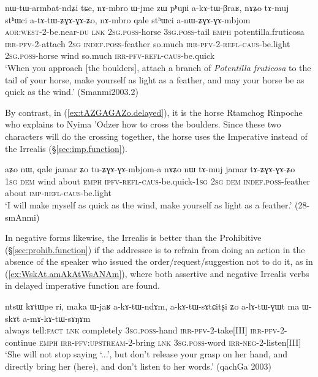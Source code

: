 \begin{exe}
\ex \label{ex:atAtWZGAGAZo.delayed}
\gll nɯ-tɯ-armbat-ndʑi tɕe, nɤ-mbro ɯ-jme zɯ pʰuɲi a-kɤ-tɯ-βraʁ, nɤʑo tɤ-muj stʰɯci a-tɤ-tɯ-ʑɣɤ-ɣɤ-ʑo, nɤ-mbro qale stʰɯci a-nɯ-ʑɣɤ-ɣɤ-mbjom \\
\textsc{aor}:\textsc{west}-2-be.near-\textsc{du} \textsc{lnk} \textsc{2sg}.\textsc{poss}-horse \textsc{3sg}.\textsc{poss}-tail \textsc{emph} potentilla.fruticosa \textsc{irr}-\textsc{pfv}-2-attach \textsc{2sg} \textsc{indef}.\textsc{poss}-feather so.much \textsc{irr}-\textsc{pfv}-2-\textsc{refl}-\textsc{caus}-be.light \textsc{2sg}.\textsc{poss}-horse wind so.much \textsc{irr}-\textsc{pfv}-\textsc{refl}-\textsc{caus}-be.quick \\
\glt `When you approach [the boulders], attach a branch of \textit{Potentilla fruticosa} to the tail of your horse, make yourself as light as a feather, and may your horse be as quick as the wind.' (Smanmi2003.2)
\end{exe}

By contrast, in (\ref{ex:tAZGAGAZo.delayed}), it is the horse Rtamchog Rinpoche who explains to Nyima 'Odzer how to cross the boulders. Since these two characters will do the crossing together, the horse uses the Imperative  instead of the Irrealis (§\ref{sec:imp.function}).

\begin{exe}
\ex \label{ex:tAZGAGAZo.delayed}
\gll aʑo nɯ, qale jamar ʑo tu-ʑɣɤ-ɣɤ-mbjom-a nɤʑo nɯ tɤ-muj jamar tɤ-ʑɣɤ-ɣɤ-ʑo \\
\textsc{1sg} \textsc{dem} wind about \textsc{emph} \textsc{ipfv}-\textsc{refl}-\textsc{caus}-be.quick-\textsc{1sg} \textsc{2sg} \textsc{dem} \textsc{indef}.\textsc{poss}-feather about \textsc{imp}-\textsc{refl}-\textsc{caus}-be.light \\
\glt `I will make myself as quick as the wind, make yourself as light as a feather.' (28-smAnmi) 
\end{exe}
 
In negative forms likewise, the Irrealis is better than the Prohibitive (§\ref{sec:prohib.function}) if the addressee is to refrain from doing an action in the absence of the speaker who issued the order/request/suggestion not to do it, as in (\ref{ex:WskAt.amAkAtWsANAm}), where both assertive and negative Irrealis verbs in delayed imperative function are found.


\begin{exe}
\ex \label{ex:WskAt.amAkAtWsANAm}
\gll  [...] ntsɯ kɤtɯpe ri, maka ɯ-jaʁ a-kɤ-tɯ-ndɤm, a-kɤ-tɯ-sɤtɕitʂi ʑo a-lɤ-tɯ-ɣɯt ma ɯ-skɤt a-mɤ-kɤ-tɯ-sɤŋɤm \\
{ } always tell:\textsc{fact} \textsc{lnk} completely \textsc{3sg}.\textsc{poss}-hand \textsc{irr}-\textsc{pfv}-2-take[III] \textsc{irr}-\textsc{pfv}-2-continue \textsc{emph} \textsc{irr}-\textsc{pfv}:\textsc{upstream}-2-bring \textsc{lnk} \textsc{3sg}.\textsc{poss}-word \textsc{irr}-\textsc{neg}-2-listen[III] \\
\glt `She will not stop saying `...', but don't release your grasp on her hand, and directly bring her (here), and don't listen to her words.' (qachGa 2003)
\end{exe}

